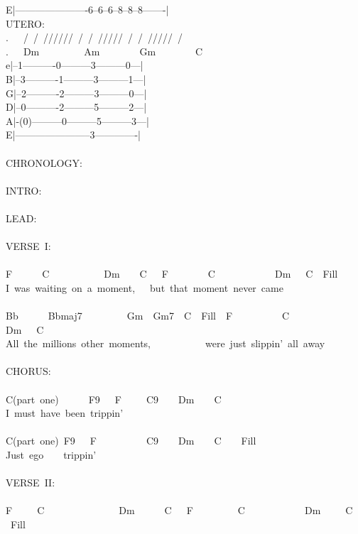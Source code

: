 {E|----------------------6--6--6--8--8--8-------|\ \\
UTERO:\\
.\ \ \ /\ /\ //////\ /\ /\ /////\ /\ /\ /////\ /\ \ \ \\
.\ \ \ Dm\ \ \ \ \ \ \ \ \ Am\ \ \ \ \ \ \ \ Gm\ \ \ \ \ \ \ \ C\\
e|--1----------0---------3---------0---|\\
B|--3----------1---------3---------1---|\\
G|--2----------2---------3---------0---|\\
D|--0----------2---------5---------2---|\\
A|-(0)---------0---------5---------3---|\\
E|-----------------------3-------------|\\
\\
CHRONOLOGY:\\
\\
INTRO:\\
\\
LEAD:\\
\\
VERSE\ I:\\
\\
F\ \ \ \ \ \ C\ \ \ \ \ \ \ \ \ \ \ Dm\ \ \ \ C\ \ \ F\ \ \ \ \ \ \ \ C\ \ \ \ \ \ \ \ \ \ \ \ Dm\ \ \ C\ \ Fill\ \\
I\ was\ waiting\ on\ a\ moment,\ \ \ but\ that\ moment\ never\ came\\
\\
Bb\ \ \ \ \ \ Bbmaj7\ \ \ \ \ \ \ \ \ Gm\ \ Gm7\ \ C\ \ Fill\ \ F\ \ \ \ \ \ \ \ \ \ C\ \ \ \ \ \ \ \ \ \ \ \ \ \ Dm\ \ \ C\\
All\ the\ millions\ other\ moments,\ \ \ \ \ \ \ \ \ \ \ were\ just\ slippin'\ all\ away\\
\\
CHORUS:\ \\
\\
C(part\ one)\ \ \ \ \ \ F9\ \ \ F\ \ \ \ \ C9\ \ \ \ Dm\ \ \ \ C\ \\
I\ must\ have\ been\ trippin'\\
\\
C(part\ one)\ F9\ \ \ F\ \ \ \ \ \ \ \ \ \ C9\ \ \ \ Dm\ \ \ \ C\ \ \ \ Fill\ \\
Just\ ego\ \ \ \ trippin'\ \\
\\
VERSE\ II:\\
\\
F\ \ \ \ \ C\ \ \ \ \ \ \ \ \ \ \ \ \ \ \ Dm\ \ \ \ \ \ C\ \ \ F\ \ \ \ \ \ \ \ \ C\ \ \ \ \ \ \ \ \ \ \ \ Dm\ \ \ \ \ C\ \ \ Fill\ \\
}
